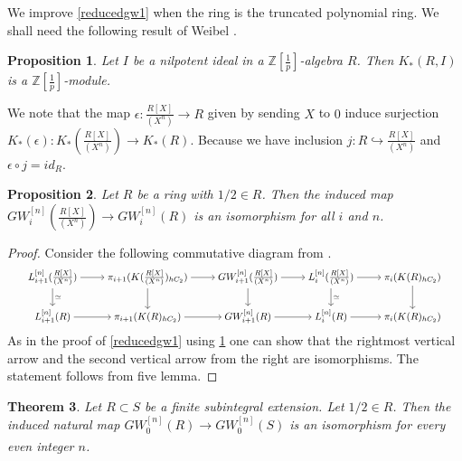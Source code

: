 \documentclass[11pt,a4paper]{amsart}
\theoremstyle{plain}
\newtheorem{thm}{Theorem}[section]
\newtheorem{prop}[thm]{Proposition}
\theoremstyle{definition}
\theoremstyle{remark}
\begin{document}
We improve \ref{reducedgw1} when the ring is the truncated polynomial ring. We shall need the following result of Weibel \cite[Consequence 1.4]{weibel2006mayer}.
\begin{prop}\label{weibelrelative}
    Let $I$ be a nilpotent ideal in a $\mathbb{Z}[\frac{1}{p}]$-algebra $R$. Then $K_*(R,I)$ is a $\mathbb{Z}[\frac{1}{p}]$-module.
\end{prop}

    We note that the map $\epsilon:\frac{R[X]}{(X^n)}\rightarrow R$ given by sending $X$ to $0$ induce surjection $K_*(\epsilon):K_*(\frac{R[X]}{(X^n)})\rightarrow K_*(R)$. Because we have inclusion $j: R\hookrightarrow \frac{R[X]}{(X^n)}$ and $\epsilon \circ j=id_R$.
    \begin{prop}
    Let $R$ be a ring with $1/2\in R$. Then the induced map $GW^{[n]}_i(\frac{R[X]}{(X^n)})\rightarrow GW^{[n]}_i(R)$ is an isomorphism for all $i$ and $n$.
\end{prop}
\begin{proof}
   Consider the following commutative diagram from \cite[Theorem 7.6]{schlichting2017hermitian}.
   \[\scalebox{0.8}{\begin{tikzcd}[ampersand replacement=\&,cramped]
	{L_{i+1}^{[n]}(\frac{R[X]}{(X^n)})} \& {\pi_{i+1}(K(\frac{R[X]}{(X^n)})_{hC_2})} \& {GW_{i+1}^{[n]}(\frac{R[X]}{(X^n)})} \& {L_{i}^{[n]}(\frac{R[X]}{(X^n)})} \& {\pi_{i}(K(R)_{hC_2})} \\
	{L_{i+1}^{[n]}(R)} \& {\pi_{i+1}(K(R)_{hC_2})} \& {GW_{i+1}^{[n]}(R)} \& {L_{i}^{[n]}(R)} \& {\pi_{i}(K(R)_{hC_2})}
	\arrow[from=1-1, to=1-2]
	\arrow["\simeq", from=1-1, to=2-1]
	\arrow[from=1-2, to=1-3]
	\arrow[from=1-2, to=2-2]
	\arrow[from=1-3, to=1-4]
	\arrow[from=1-3, to=2-3]
	\arrow[from=1-4, to=1-5]
	\arrow["\simeq", from=1-4, to=2-4]
	\arrow[from=1-5, to=2-5]
	\arrow[from=2-1, to=2-2]
	\arrow[from=2-2, to=2-3]
	\arrow[from=2-3, to=2-4]
	\arrow[from=2-4, to=2-5]
\end{tikzcd}}\]
As in the proof of \ref{reducedgw1} using \ref{weibelrelative} one can show that the rightmost vertical arrow and the second vertical arrow from the right are isomorphisms. The statement follows from five lemma.
\end{proof}
\begin{thm}\label{main1}
      Let $R\subset S$ be a finite subintegral extension. Let $1/2\in R$. Then the induced natural map $GW^{[n]}_0(R)\xrightarrow[]{}GW^{[n]}_0(S)$ is an isomorphism for every even integer $n$.
\end{thm}
\end{document}

